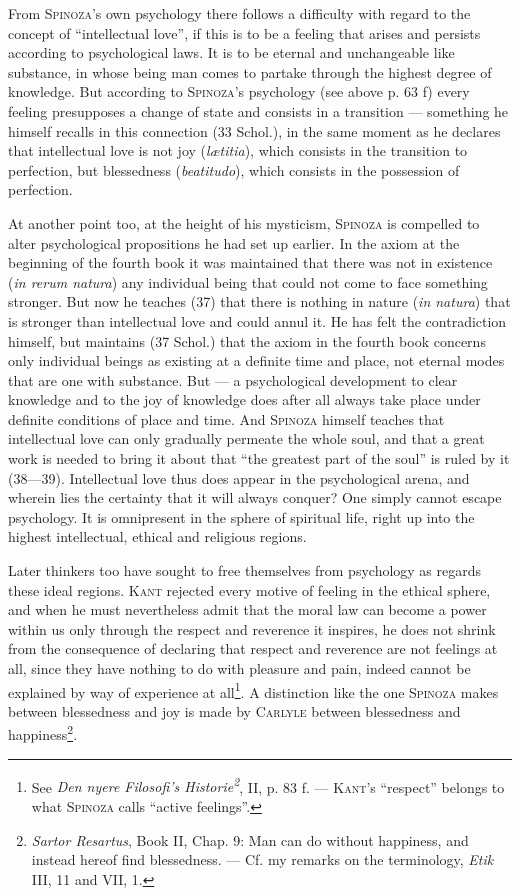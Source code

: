 \documentclass[12pt]{article}
\newcommand{\opage}[1]{\marginnote{\footnotesize\textit{[#1]}}}
\begin{document}
From \textsc{Spinoza}'s own psychology there follows a difficulty with regard to the concept of
``intellectual love'', if this is to be a feeling that arises and persists according to
psychological laws. It is to be eternal and unchangeable like substance, in whose being man comes to
partake through the highest degree of knowledge. But according to \textsc{Spinoza}'s psychology (see
above p. 63 f) every feeling presupposes a change of state \opage{93}and consists in a transition
--- something he himself recalls in this connection (33 Schol.), in the same moment as he declares
that intellectual love is not joy (\textit{lætitia}), which consists in the transition to
perfection, but blessedness (\textit{beatitudo}), which consists in the possession of perfection.

At another point too, at the height of his mysticism, \textsc{Spinoza} is compelled to alter
psychological propositions he had set up earlier. In the axiom at the beginning of the fourth book
it was maintained that there was not in existence (\textit{in rerum natura}) any individual being
that could not come to face something stronger. But now he teaches (37) that there is nothing in
nature (\textit{in natura}) that is stronger than intellectual love and could annul it. He has felt
the contradiction himself, but maintains (37 Schol.) that the axiom in the fourth book concerns only
individual beings as existing at a definite time and place, not eternal modes that are one with
substance. But --- a psychological development to clear knowledge and to the joy of knowledge does
after all always take place under definite conditions of place and time. And \textsc{Spinoza}
himself teaches that intellectual love can only gradually permeate the whole soul, and that a great
work is needed to bring it about that ``the greatest part of the soul'' is ruled by it (38---39).
Intellectual love thus does appear in the psychological arena, and wherein lies the certainty that
it will always conquer? One simply cannot escape psychology. It is omnipresent in the sphere of
spiritual life, right up into the highest intellectual, ethical and religious regions.

Later thinkers too have sought to free themselves from psychology as regards these ideal regions.
\textsc{Kant} rejected every motive of feeling in the ethical sphere, and when he must nevertheless
admit that the moral law can become a power within us only through the respect and reverence it
inspires, he does not shrink from the consequence of declaring that respect and reverence are not
feelings at all, since they have nothing to do with pleasure and pain, indeed cannot be explained
by way of experience at all\footnote{See \textit{Den nyere Filosofi's Historie\textsuperscript{2}},
II, p. 83 f. --- \textsc{Kant}'s ``respect'' belongs to what \textsc{Spinoza} calls ``active
feelings''.}. A distinction like the one \textsc{Spinoza} makes between blessedness and joy is made
by \textsc{Carlyle} between blessedness and happiness\footnote{\textit{Sartor Resartus}, Book II,
Chap. 9: Man can do without happiness, and instead hereof find blessedness. --- Cf. my remarks on
the terminology, \textit{Etik} III, 11 and VII, 1.}.
\end{document}
